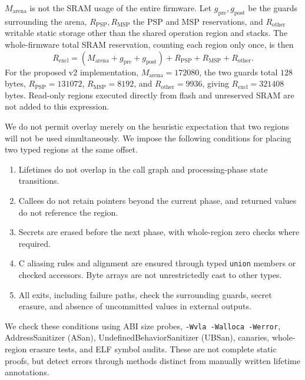 \documentclass[a4paper,10pt]{article}
\theoremstyle{definition}
\theoremstyle{remark}
\begin{document}
$M_{\mathrm{arena}}$ is not the SRAM usage of the entire firmware. Let $g_{\mathrm{pre}},g_{\mathrm{post}}$ be the guards surrounding the arena, $R_{\mathrm{PSP}},R_{\mathrm{MSP}}$ the PSP and MSP reservations, and $R_{\mathrm{other}}$ writable static storage other than the shared operation region and stacks. The whole-firmware total SRAM reservation, counting each region only once, is then
\begin{equation}
  R_{\mathrm{excl}}=
  (M_{\mathrm{arena}}+g_{\mathrm{pre}}+g_{\mathrm{post}})
  +R_{\mathrm{PSP}}+R_{\mathrm{MSP}}+R_{\mathrm{other}}.
  \label{eq:exclusive-sram}
\end{equation}
For the proposed v2 implementation, $M_{\mathrm{arena}}=\num{172080}$, the two guards total
$128$ bytes, $R_{\mathrm{PSP}}=\num{131072}$,
$R_{\mathrm{MSP}}=\num{8192}$, and $R_{\mathrm{other}}=\num{9936}$, giving
$R_{\mathrm{excl}}=\num{321408}$ bytes. Read-only regions executed directly from flash and unreserved SRAM are not added to this expression.

We do not permit overlay merely on the heuristic expectation that two regions will not be used simultaneously. We impose the following conditions for placing two typed regions at the same offset.

\begin{enumerate}[leftmargin=2.2em]
  \item Lifetimes do not overlap in the call graph and processing-phase state transitions.
  \item Callees do not retain pointers beyond the current phase, and returned values do not reference the region.
  \item Secrets are erased before the next phase, with whole-region zero checks where required.
  \item C aliasing rules and alignment are ensured through typed \texttt{union} members or checked accessors. Byte arrays are not unrestrictedly cast to other types.
  \item All exits, including failure paths, check the surrounding guards, secret erasure, and absence of uncommitted values in external outputs.
\end{enumerate}

We check these conditions using ABI size probes, \texttt{-Wvla -Walloca -Werror}, AddressSanitizer (ASan), UndefinedBehaviorSanitizer (UBSan), canaries, whole-region erasure tests, and ELF symbol audits. These are not complete static proofs, but detect errors through methods distinct from manually written lifetime annotations.
\end{document}
